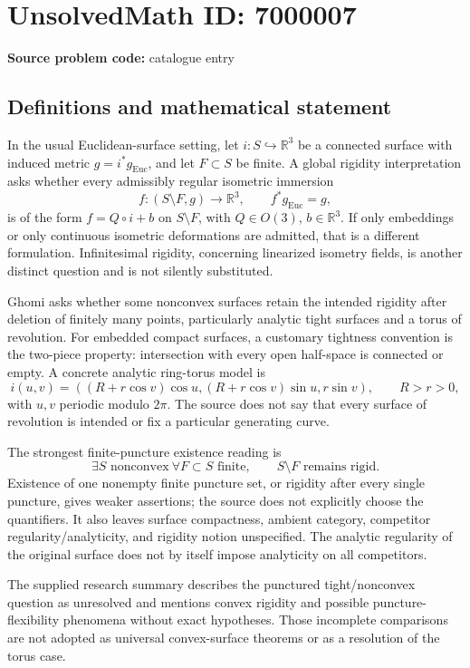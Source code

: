 \documentclass[11pt]{article}
\newcommand{\R}{\mathbb{R}}
\begin{document}
\section*{UnsolvedMath ID: 7000007}
\textbf{Source problem code:} catalogue entry
\subsection{Definitions and mathematical statement}
In the usual Euclidean-surface setting, let \(i:S\hookrightarrow\R^3\) be a connected surface with induced metric \(g=i^*g_{\mathrm{Euc}}\), and let \(F\subset S\) be finite. A global rigidity interpretation asks whether every admissibly regular isometric immersion
\[
f:(S\setminus F,g)\to\R^3,\qquad f^*g_{\mathrm{Euc}}=g,
\]
is of the form \(f=Q\circ i+b\) on \(S\setminus F\), with \(Q\in O(3)\), \(b\in\R^3\). If only embeddings or only continuous isometric deformations are admitted, that is a different formulation. Infinitesimal rigidity, concerning linearized isometry fields, is another distinct question and is not silently substituted.

Ghomi asks whether some nonconvex surfaces retain the intended rigidity after deletion of finitely many points, particularly analytic tight surfaces and a torus of revolution. For embedded compact surfaces, a customary tightness convention is the two-piece property: intersection with every open half-space is connected or empty. A concrete analytic ring-torus model is
\[
i(u,v)=((R+r\cos v)\cos u,(R+r\cos v)\sin u,r\sin v),
\qquad R>r>0,
\]
with \(u,v\) periodic modulo \(2\pi\). The source does not say that every surface of revolution is intended or fix a particular generating curve.

The strongest finite-puncture existence reading is
\[
\exists S\text{ nonconvex}\ \forall F\subset S\text{ finite},
\qquad S\setminus F\text{ remains rigid}.
\]
Existence of one nonempty finite puncture set, or rigidity after every single puncture, gives weaker assertions; the source does not explicitly choose the quantifiers. It also leaves surface compactness, ambient category, competitor regularity/analyticity, and rigidity notion unspecified. The analytic regularity of the original surface does not by itself impose analyticity on all competitors.

The supplied research summary describes the punctured tight/nonconvex question as unresolved and mentions convex rigidity and possible puncture-flexibility phenomena without exact hypotheses. Those incomplete comparisons are not adopted as universal convex-surface theorems or as a resolution of the torus case.
\end{document}
